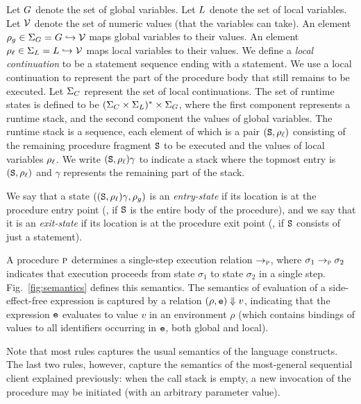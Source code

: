 Let $G$ denote the set of global variables. Let $L$ denote the set of local variables.
Let $\mathcal{V}$ denote the set of numeric values (that the variables can take).
An element $\rho_g \in \Sigma_G = G \hookrightarrow \mathcal{V}$ maps global variables to their values.
An element $\rho_\ell \in \Sigma_L = L \hookrightarrow \mathcal{V}$ maps local variables to their values.
We define a \emph{local continuation} to be a statement sequence ending with a  statement.
We use a local continuation to represent the part of the procedure body that still remains to be
executed. Let $\Sigma_C$ represent the set of local continuations.
The set of runtime states is defined to be $(\Sigma_C \times \Sigma_L)^* \times \Sigma_G$, where
the first component represents a runtime stack, and the second component the values of global
variables. The runtime stack is a sequence, each element of which is a pair $(\texttt{S},\rho_\ell)$ consisting of the
remaining procedure fragment $\texttt{S}$ to be executed and the values of local variables $\rho_\ell$.
We write $(\texttt{S},\rho_\ell)\gamma$ to indicate a stack where the topmost entry is $(\texttt{S},\rho_\ell)$
and $\gamma$ represents the remaining part of the stack.

We say that a state $((\texttt{S},\rho_\ell)\gamma,\rho_g)$ is an \emph{entry-state} if its location is at
the procedure entry point (\ie, if $\texttt{S}$ is the entire body of the procedure),
and we say that it is an \emph{exit-state} if its location is at the procedure exit point
(\ie, if $\texttt{S}$ consists of just a  statement).

A procedure $\textsc{p}$ determines a single-step execution relation $\rightarrow_{\textsc{p}}$,
where $\sigma_1 \rightarrow_{\textsc{p}} \sigma_2$ indicates
that execution proceeds from state $\sigma_1$ to state $\sigma_2$ in a single step.
Fig.~\ref{fig:semantics} defines this semantics.
The semantics of evaluation of a side-effect-free expression is captured
by a relation $({\rho},{\texttt{e}}) \Downarrow {v}$, indicating that the expression
$\texttt{e}$ evaluates to value $v$ in an environment $\rho$ (which contains bindings
of values to all identifiers occurring in $\texttt{e}$, both global and local).

Note that most rules captures the usual semantics of the language constructs.
The last two rules, however, capture the semantics of the most-general sequential
client explained previously: when the call stack is empty, a new invocation of
the procedure may be initiated (with an arbitrary parameter value).

